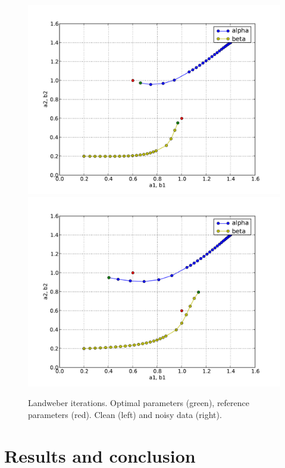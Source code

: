 \begin{figure}
  \begin{center}
    \includegraphics[width=\smallfig]{chapters/schroll/pdf/4D-1scan4b.pdf}
    \includegraphics[width=\smallfig]{chapters/schroll/pdf/4D-1scan4b-5.pdf}
    \vspace{-0.7cm}
    \caption{Landweber iterations. Optimal parameters (green), reference
    parameters (red). Clean (left) and noisy data (right).}
    \label{fig6}
  \end{center}
\end{figure}

\section{Results and conclusion}

